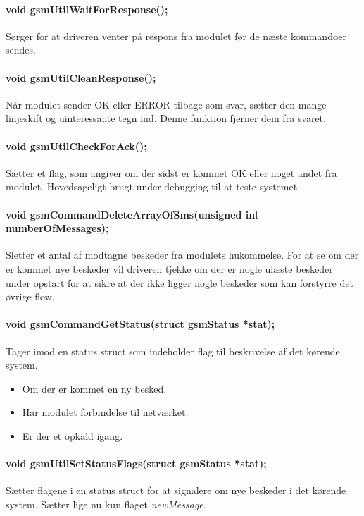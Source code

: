 \paragraph{void gsmUtilWaitForResponse();}
Sørger for at driveren venter på respons fra modulet før de næste kommandoer sendes.

\paragraph{void gsmUtilCleanResponse();}
Når modulet sender OK eller ERROR tilbage som svar, sætter den mange linjeskift og uinteressante tegn ind. Denne funktion fjerner dem fra svaret.

\paragraph{void gsmUtilCheckForAck();}
Sætter et flag, som angiver om der sidst er kommet OK eller noget andet fra modulet. Hovedsageligt brugt under debugging til at teste systemet.

\paragraph{void gsmCommandDeleteArrayOfSms(unsigned int numberOfMessages);}
Sletter et antal af modtagne beskeder fra modulets hukommelse. For at se om der er kommet nye beskeder vil driveren tjekke om der er nogle ulæste beskeder under opstart for at sikre at der ikke ligger nogle beskeder som kan forstyrre det øvrige flow.

\paragraph{void gsmCommandGetStatus(struct gsmStatus *stat);}
Tager imod en status struct som indeholder flag til beskrivelse af det kørende system.

\begin{itemize}
	\item Om der er kommet en ny besked.
	\item Har modulet forbindelse til netværket.
	\item Er der et opkald igang.
\end{itemize}

\paragraph{void gsmUtilSetStatusFlags(struct gsmStatus *stat);}
Sætter flagene i en status struct for at signalere om nye beskeder i det kørende system. Sætter lige nu kun flaget \textit{newMessage}.

